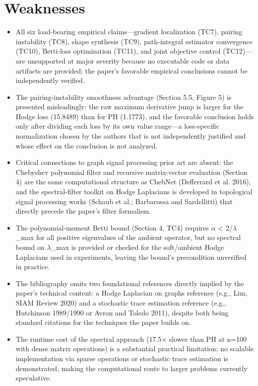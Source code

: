 \documentclass[11pt]{article}
\begin{document}
\section*{Weaknesses}
\begin{itemize}[leftmargin=*]
  \item All six load-bearing empirical claims---gradient localization (TC7), pairing instability (TC8), shape synthesis (TC9), path-integral estimator convergence (TC10), Betti-loss optimization (TC11), and joint objective control (TC12)---are unsupported at major severity because no executable code or data artifacts are provided; the paper's favorable empirical conclusions cannot be independently verified.
  \item The pairing-instability smoothness advantage (Section 5.5, Figure 5) is presented misleadingly: the raw maximum derivative jump is larger for the Hodge loss (15.8489) than for PH (1.1773), and the favorable conclusion holds only after dividing each loss by its own value range---a loss-specific normalization chosen by the authors that is not independently justified and whose effect on the conclusion is not analyzed.
  \item Critical connections to graph signal processing prior art are absent: the Chebyshev polynomial filter and recursive matrix-vector evaluation (Section 4) are the same computational structure as ChebNet (Defferrard et al. 2016), and the spectral-filter toolkit on Hodge Laplacians is developed in topological signal processing works (Schaub et al.; Barbarossa and Sardellitti) that directly precede the paper's filter formalism.
  \item The polynomial-moment Betti bound (Section 4, TC4) requires \ensuremath{\alpha} < 2/\ensuremath{\lambda}\_max for all positive eigenvalues of the ambient operator, but no spectral bound on \ensuremath{\lambda}\_max is provided or checked for the soft/ambient Hodge Laplacians used in experiments, leaving the bound's precondition unverified in practice.
  \item The bibliography omits two foundational references directly implied by the paper's technical content: a Hodge Laplacian on graphs reference (e.g., Lim, SIAM Review 2020) and a stochastic trace estimation reference (e.g., Hutchinson 1989/1990 or Avron and Toledo 2011), despite both being standard citations for the techniques the paper builds on.
  \item The runtime cost of the spectral approach (17.5\ensuremath{\times} slower than PH at n=100 with dense matrix operations) is a substantial practical limitation; no scalable implementation via sparse operations or stochastic trace estimation is demonstrated, making the computational route to larger problems currently speculative.
\end{itemize}
\end{document}
